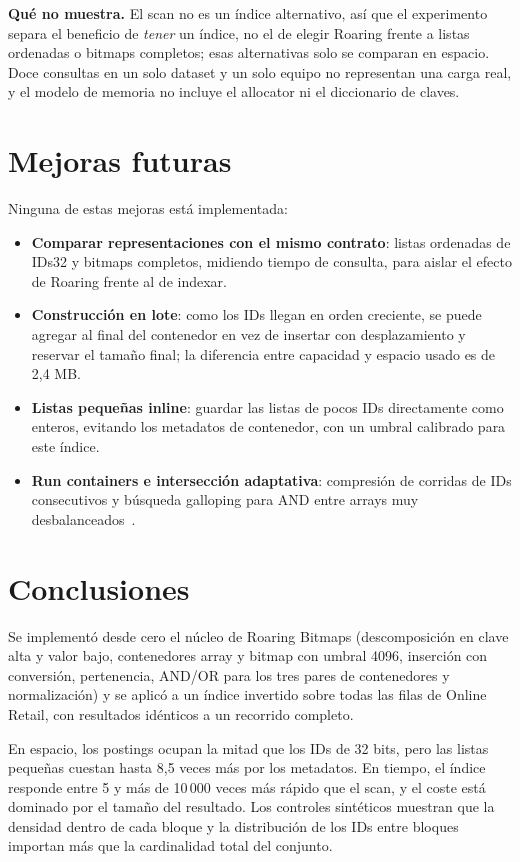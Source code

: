 \documentclass[11pt,a4paper]{article}
\begin{document}
\textbf{Qué no muestra.} El scan no es un índice alternativo, así que el experimento separa el beneficio de \emph{tener} un índice, no el de elegir Roaring frente a listas ordenadas o bitmaps completos; esas alternativas solo se comparan en espacio. Doce consultas en un solo dataset y un solo equipo no representan una carga real, y el modelo de memoria no incluye el allocator ni el diccionario de claves.

\section{Mejoras futuras}
Ninguna de estas mejoras está implementada:
\begin{itemize}
\item \textbf{Comparar representaciones con el mismo contrato}: listas ordenadas de IDs32 y bitmaps completos, midiendo tiempo de consulta, para aislar el efecto de Roaring frente al de indexar.
\item \textbf{Construcción en lote}: como los IDs llegan en orden creciente, se puede agregar al final del contenedor en vez de insertar con desplazamiento y reservar el tamaño final; la diferencia entre capacidad y espacio usado es de 2,4 MB.
\item \textbf{Listas pequeñas inline}: guardar las listas de pocos IDs directamente como enteros, evitando los metadatos de contenedor, con un umbral calibrado para este índice.
\item \textbf{Run containers e intersección adaptativa}: compresión de corridas de IDs consecutivos y búsqueda galloping para AND entre arrays muy desbalanceados~\cite{chambi2016,lemire2018}.
\end{itemize}

\section{Conclusiones}
Se implementó desde cero el núcleo de Roaring Bitmaps (descomposición en clave alta y valor bajo, contenedores array y bitmap con umbral 4096, inserción con conversión, pertenencia, AND/OR para los tres pares de contenedores y normalización) y se aplicó a un índice invertido sobre todas las filas de Online Retail, con resultados idénticos a un recorrido completo.

En espacio, los postings ocupan la mitad que los IDs de 32 bits, pero las listas pequeñas cuestan hasta 8,5 veces más por los metadatos. En tiempo, el índice responde entre 5 y más de 10\,000 veces más rápido que el scan, y el coste está dominado por el tamaño del resultado. Los controles sintéticos muestran que la densidad dentro de cada bloque y la distribución de los IDs entre bloques importan más que la cardinalidad total del conjunto.
\end{document}
